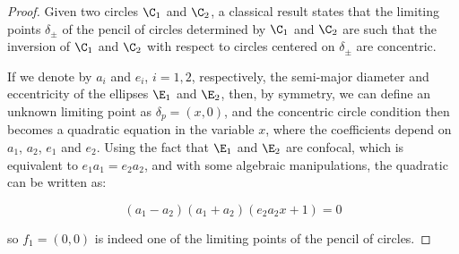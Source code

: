 \begin{proof}
Given two circles $\C_{1}$ and $\C_{2}$, a classical result states that the limiting points $\delta_{\pm}$ of the pencil of circles determined by $\C_{1}$ and $\C_{2}$ are such that the inversion of $\C_{1}$ and $\C_{2}$ with respect to circles centered on $\delta_{\pm}$ are concentric.

If we denote by $a_{i}$ and $e_{i}$, $i=1,2$, respectively, the semi-major diameter and eccentricity of the ellipses $\E_{1}$ and $\E_{2}$, then, by symmetry, we can define an unknown limiting point as $\delta_{p}=(x,0)$, and the concentric circle condition then becomes a quadratic equation in the variable $x$, where the coefficients depend on $a_{1}$, $a_{2}$, $e_{1}$ and $e_{2}$. Using the fact that $\E_{1}$ and $\E_{2}$ are confocal, which is equivalent to $e_{1}a_{1}=e_{2}a_{2}$, and with some algebraic manipulations, the quadratic can be written as:

\[ (a_{1}-a_{2})(a_{1}+a_{2})(e_{2}a_{2}x+1)=0 \]

\noindent so $f_{1}=(0,0)$ is indeed one of the limiting points of the pencil of circles.
\end{proof}  

